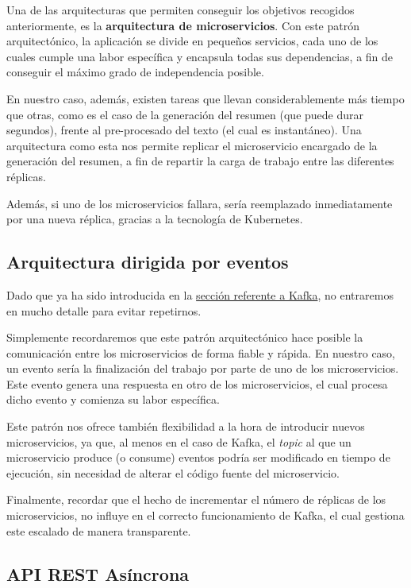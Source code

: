 Una de las arquitecturas que permiten conseguir los objetivos recogidos anteriormente, es la \textbf{arquitectura de microservicios}. Con este patrón arquitectónico, la aplicación se divide en pequeños servicios, cada uno de los cuales cumple una labor específica y encapsula todas sus dependencias, a fin de conseguir el máximo grado de independencia posible.

En nuestro caso, además, existen tareas que llevan considerablemente más tiempo que otras, como es el caso de la generación del resumen (que puede durar segundos), frente al pre-procesado del texto (el cual es instantáneo). Una arquitectura como esta nos permite replicar el microservicio encargado de la generación del resumen, a fin de repartir la carga de trabajo entre las diferentes réplicas.

Además, si uno de los microservicios fallara, sería reemplazado inmediatamente por una nueva réplica, gracias a la tecnología de Kubernetes.

\subsection{Arquitectura dirigida por eventos}

Dado que ya ha sido introducida en la \hyperref[subsec:kafka]{sección referente a Kafka}, no entraremos en mucho detalle para evitar repetirnos.

Simplemente recordaremos que este patrón arquitectónico hace posible la comunicación entre los microservicios de forma fiable y rápida. En nuestro caso, un evento sería la finalización del trabajo por parte de uno de los microservicios. Este evento genera una respuesta en otro de los microservicios, el cual procesa dicho evento y comienza su labor específica.

Este patrón nos ofrece también flexibilidad a la hora de introducir nuevos microservicios, ya que, al menos en el caso de Kafka, el \emph{topic} al que un microservicio produce (o consume) eventos podría ser modificado en tiempo de ejecución, sin necesidad de alterar el código fuente del microservicio.

Finalmente, recordar que el hecho de incrementar el número de réplicas de los microservicios, no influye en el correcto funcionamiento de Kafka, el cual gestiona este escalado de manera transparente.

\subsection{API REST Asíncrona}

